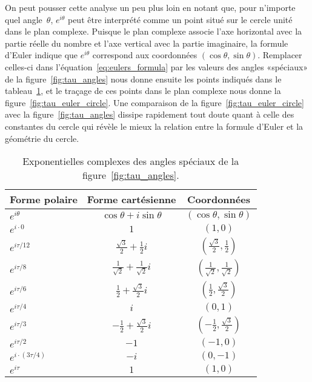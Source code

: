 On peut pousser cette analyse un peu plus loin en notant que, pour n'importe
quel angle~$\theta$, $e^{i\theta}$ peut être interprété comme un point situé sur
le cercle unité dans le plan complexe. Puisque le plan complexe associe l'axe
horizontal avec la partie réelle du nombre et l'axe vertical avec la partie
imaginaire, la formule d'Euler indique que $e^{i\theta}$ correspond aux
coordonnées $(\cos\theta,\sin\theta)$. Remplacer celles-ci dans
l'équation~\eqref{eq:eulers_formula} par les valeurs des angles «\ns spéciaux\ns »
de la figure~\ref{fig:tau_angles} nous donne ensuite les points indiqués dans le
tableau~\ref{table:complex_exponentials}, et le traçage de ces points dans le
plan complexe nous donne la figure~\ref{fig:tau_euler_circle}. Une comparaison de la
figure~\ref{fig:tau_euler_circle} avec la figure~\ref{fig:tau_angles} dissipe
rapidement tout doute quant à celle des constantes du cercle qui révèle le
mieux la relation entre la formule d'Euler et la géométrie du cercle.

\begin{table}
\begin{center}
\begin{tabular}{lcc}
Forme polaire & Forme cartésienne & Coordonnées \\ \hline\hline
$e^{i\theta}$ & $\cos\theta + i\sin\theta$ & $(\cos\theta, \sin\theta)$ \\ \hline
$e^{i\cdot0}$ & $1$ & $(1, 0)$ \smallskip \\
$e^{i\tau/12}$ & $\frac{\sqrt{3}}{2} + \frac{1}{2}i$ & $(\frac{\sqrt{3}}{2}, \frac{1}{2})$ \smallskip \\
$e^{i\tau/8}$ & $\frac{1}{\sqrt{2}} +  \frac{1}{\sqrt{2}}i$ & $(\frac{1}{\sqrt{2}}, \frac{1}{\sqrt{2}})$ \smallskip \\
$e^{i\tau/6}$ & $\frac{1}{2} +\frac{\sqrt{3}}{2} i$ & $(\frac{1}{2}, \frac{\sqrt{3}}{2})$ \smallskip \\
$e^{i\tau/4}$ & $i$ & $(0, 1)$ \smallskip \\
$e^{i\tau/3}$ & $-\frac{1}{2} +\frac{\sqrt{3}}{2} i$ & $(-\frac{1}{2}, \frac{\sqrt{3}}{2})$ \smallskip \\
$e^{i\tau/2}$ & $-1$ & $(-1, 0)$ \smallskip \\
$e^{i\cdot(3\tau/4)}$ & $-i$ & $(0, -1)$ \smallskip \\
$e^{i\tau}$ & $1$ & $(1, 0)$
\end{tabular}
\end{center}
\caption{Exponentielles complexes des angles spéciaux de la
figure~\ref{fig:tau_angles}.\label{table:complex_exponentials}}
\end{table}

